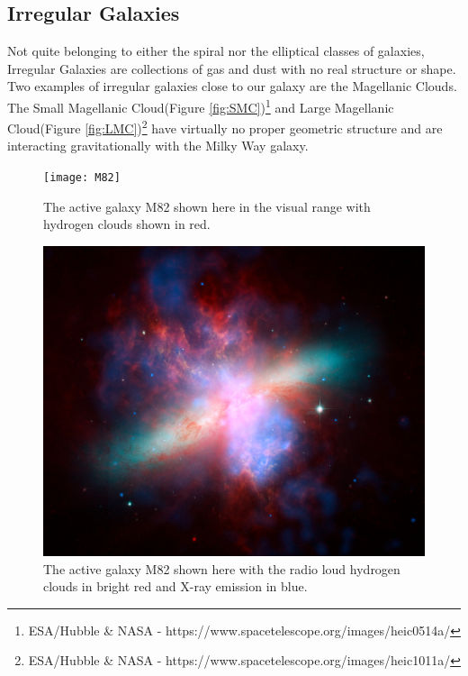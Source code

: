 \documentclass[12pt, oneside]{smuthesis}
\begin{document}
\subsection{\sc Irregular Galaxies} \label{irregularGalaxies}

Not quite belonging to either the spiral nor the elliptical classes of galaxies, Irregular Galaxies are collections of gas and dust with no real structure or shape. Two examples of irregular galaxies close to our galaxy are the Magellanic Clouds. The Small Magellanic Cloud(Figure \ref{fig:SMC})\footnote{ESA/Hubble \& NASA - https://www.spacetelescope.org/images/heic0514a/} and Large Magellanic Cloud(Figure \ref{fig:LMC})\footnote{ESA/Hubble \& NASA - https://www.spacetelescope.org/images/heic1011a/} have virtually no proper geometric structure and are interacting gravitationally with the Milky Way galaxy.

\begin{figure}[H]
	\centering
	\begin{minipage}{0.48\textwidth}
		\centering
		\texttt{[image: M82]}
		\caption{The active galaxy M82 shown here in the visual range with hydrogen clouds shown in red.}
		\label{fig:M82}
	\end{minipage}
	\begin{minipage}{0.04\textwidth}
		\centering
	\end{minipage}
	\begin{minipage}{0.48\textwidth}
		\centering
		\includegraphics[width=0.87\linewidth]{M82-xray}
		\caption{The active galaxy M82 shown here with the radio loud hydrogen clouds in bright red and X-ray emission in blue.}
		\label{fig:M82-xray}
	\end{minipage}
\end{figure}
\end{document}
